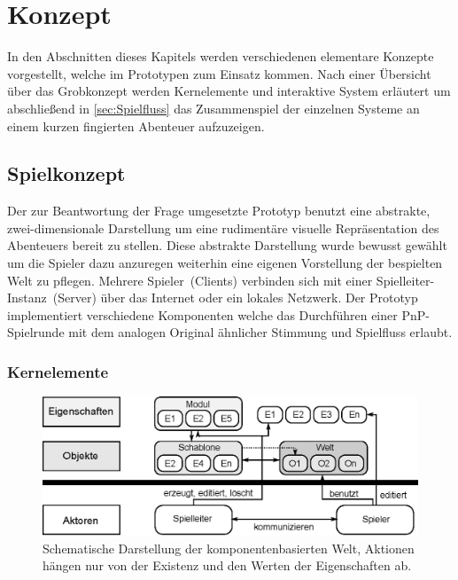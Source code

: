 \chapter{Konzept}
\label{concept}
In den Abschnitten dieses Kapitels werden verschiedenen elementare Konzepte vorgestellt, welche im Prototypen zum Einsatz kommen. Nach einer Übersicht über das Grobkonzept werden Kernelemente und interaktive System erläutert um abschließend in \ref{sec:Spielfluss} das Zusammenspiel der einzelnen Systeme an einem kurzen fingierten Abenteuer aufzuzeigen.

\section{Spielkonzept}
\label{sec:Grobkonzept}
Der zur Beantwortung der Frage umgesetzte Prototyp benutzt eine abstrakte, zwei-dimensionale Darstellung um eine rudimentäre visuelle Repräsentation des Abenteuers bereit zu stellen. Diese abstrakte Darstellung wurde bewusst gewählt um die Spieler dazu anzuregen weiterhin eine eigenen Vorstellung der bespielten Welt zu pflegen. Mehrere Spieler~(Clients) verbinden sich mit einer Spielleiter-Instanz~(Server) über das Internet oder ein lokales Netzwerk. Der Prototyp implementiert verschiedene Komponenten welche das Durchführen einer PnP-Spielrunde mit dem analogen Original ähnlicher Stimmung und Spielfluss erlaubt.



\subsection{Kernelemente}


\begin{figure}
	\centering
		\includegraphics[width=1.00\textwidth]{media/konzept_schema.eps}
	\caption{Schematische Darstellung der komponentenbasierten Welt, Aktionen hängen nur von der Existenz und den Werten der Eigenschaften ab.}
	\label{fig:konzept_schema}
\end{figure}

